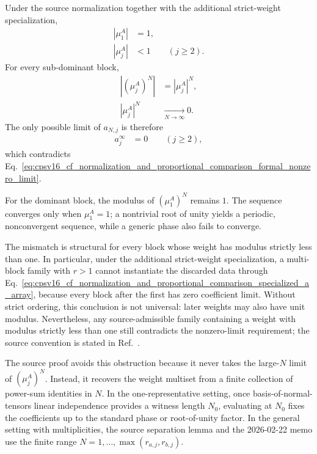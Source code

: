\documentclass{article}
\begin{document}
Under the source normalization together with the additional strict-weight
specialization,
\begin{align}
    |\mu_1^A|
        &= 1,
    \label{eq:cpsv16_cf_normalization_and_proportional_comparison_source_dominant_modulus}\\
    |\mu_j^A|
        &< 1
        \qquad (j\geq 2).
    \label{eq:cpsv16_cf_normalization_and_proportional_comparison_source_subdominant_modulus}
\end{align}
For every sub-dominant block,
\begin{align}
    |(\mu_j^A)^N|
        &= |\mu_j^A|^N,
    \label{eq:cpsv16_cf_normalization_and_proportional_comparison_power_modulus}\\
    |\mu_j^A|^N
        &\xrightarrow[N\to\infty]{} 0.
    \label{eq:cpsv16_cf_normalization_and_proportional_comparison_subdominant_decay}
\end{align}
The only possible limit of $a_{N,j}$ is therefore
\begin{align}
    a_j^\infty
        &= 0
        \qquad (j\geq 2),
    \label{eq:cpsv16_cf_normalization_and_proportional_comparison_subdominant_zero_limit}
\end{align}
which contradicts
Eq.~\ref{eq:cpsv16_cf_normalization_and_proportional_comparison_formal_nonzero_limit}.

For the dominant block, the modulus of $(\mu_1^A)^N$ remains $1$. The sequence
converges only when $\mu_1^A=1$; a nontrivial root of unity yields a periodic,
nonconvergent sequence, while a generic phase also fails to converge.

The mismatch is structural for every block whose weight has modulus strictly
less than one. In particular, under the additional strict-weight
specialization, a multi-block family with $r>1$ cannot instantiate the
discarded data through
Eq.~\ref{eq:cpsv16_cf_normalization_and_proportional_comparison_specialized_a_array},
because every block after the first has zero coefficient limit. Without strict
ordering, this conclusion is not universal: later weights may also have unit
modulus. Nevertheless, any source-admissible family containing a weight with
modulus strictly less than one still contradicts the nonzero-limit
requirement; the source convention is stated in
Ref.~\cite{Cirac2016MPDO_arXiv}.

The source proof avoids this obstruction because it never takes the large-$N$
limit of $(\mu_j^A)^N$. Instead, it recovers the weight multiset from a finite
collection of power-sum identities in $N$. In the one-representative setting,
once basis-of-normal-tensors linear independence provides a witness length
$N_0$, evaluating at $N_0$ fixes the coefficients up to the standard
phase or root-of-unity factor. In the general setting with multiplicities, the
source separation lemma and the 2026-02-22 memo use the finite range
$N=1,\ldots,\max(r_{a,j},r_{b,j})$.
\end{document}
